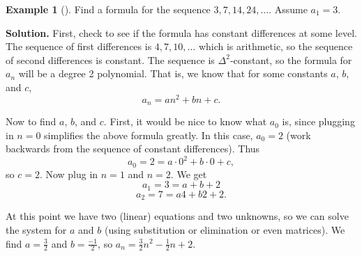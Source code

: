 \documentclass[10pt,]{book}
\theoremstyle{plain}
\theoremstyle{definition}
\theoremstyle{definition}
\newtheorem{example}[theorem]{Example}
\theoremstyle{definition}
\theoremstyle{definition}
\numberwithin{equation}{chapter}
\begin{document}
\begin{example}[]\label{example-15}
\hypertarget{p-241}{}%
Find a formula for the sequence \(3, 7, 14, 24,\ldots\). Assume \(a_1 = 3\).%
\par\smallskip%
\noindent\textbf{Solution.}\hypertarget{solution-26}{}\quad%
\hypertarget{p-242}{}%
First, check to see if the formula has constant differences at some level. The sequence of first differences is \(4, 7, 10, \ldots\) which is arithmetic, so the sequence of second differences is constant. The sequence is \(\Delta^2\)-constant, so the formula for \(a_n\) will be a degree 2 polynomial. That is, we know that for some constants \(a\), \(b\), and \(c\),%
\begin{equation*}
a_n = an^2 + bn + c.
\end{equation*}
%
\par
\hypertarget{p-243}{}%
Now to find \(a\), \(b\), and \(c\). First, it would be nice to know what \(a_0\) is, since plugging in \(n = 0\) simplifies the above formula greatly. In this case, \(a_0 = 2\) (work backwards from the sequence of constant differences). Thus%
\begin{equation*}
a_0 = 2 = a\cdot 0^2 + b \cdot 0 + c,
\end{equation*}
so \(c = 2\). Now plug in \(n =1\) and \(n = 2\). We get%
\begin{equation*}
a_1 = 3 = a + b + 2
\end{equation*}
%
\begin{equation*}
a_2 = 7 = a4 + b 2 + 2.
\end{equation*}
%
\par
\hypertarget{p-244}{}%
At this point we have two (linear) equations and two unknowns, so we can solve the system for \(a\) and \(b\) (using substitution or elimination or even matrices). We find \(a = \frac{3}{2}\) and \(b = \frac{-1}{2}\), so \(a_n = \frac{3}{2} n^2 - \frac{1}{2}n + 2\).%
\end{example}
\end{document}
